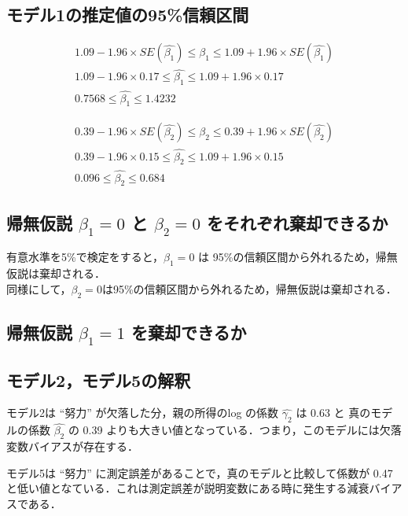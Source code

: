 \documentclass{article}
\begin{document}
\subsection{モデル1の推定値の95\%信頼区間}

\begin{centering}
  \begin{gather}
    1.09 - 1.96 \times SE(\hat{\beta_1}) \le \hat{\beta_1} \le 1.09 + 1.96 \times SE(\hat{\beta_1}) \\
    1.09 - 1.96 \times 0.17 \le \hat{\beta_1} \le 1.09 + 1.96 \times 0.17 \\
    0.7568 \le \hat{\beta_1} \le 1.4232
  \end{gather}
\end{centering}

\begin{centering}
  \begin{gather}
    0.39 - 1.96 \times SE(\hat{\beta_2}) \le \hat{\beta_2} \le 0.39 + 1.96 \times SE(\hat{\beta_2}) \\
    0.39 - 1.96 \times 0.15 \le \hat{\beta_2} \le 1.09 + 1.96 \times 0.15 \\
    0.096 \le \hat{\beta_2} \le 0.684
  \end{gather}
\end{centering}

\subsection{帰無仮説 $\beta_1 = 0$ と $\beta_2 = 0$ をそれぞれ棄却できるか }

有意水準を5\%で検定をすると，$\beta_1 = 0$ は 95\%の信頼区間から外れるため，帰無仮説は棄却される．\\
同様にして，$\beta_2 = 0$は95\%の信頼区間から外れるため，帰無仮説は棄却される．

\subsection{帰無仮説 $\beta_1 = 1$ を棄却できるか }

\subsection{モデル2，モデル5の解釈}

モデル2は “努力” が欠落した分，親の所得のlog の係数 $\hat{\gamma_2}$ は 0.63 と 真のモデルの係数 $\hat{\beta_2}$ の 0.39 よりも大きい値となっている．つまり，このモデルには欠落変数バイアスが存在する．

モデル5は “努力” に測定誤差があることで，真のモデルと比較して係数が 0.47 と低い値となている．これは測定誤差が説明変数にある時に発生する減衰バイアスである．
\end{document}

